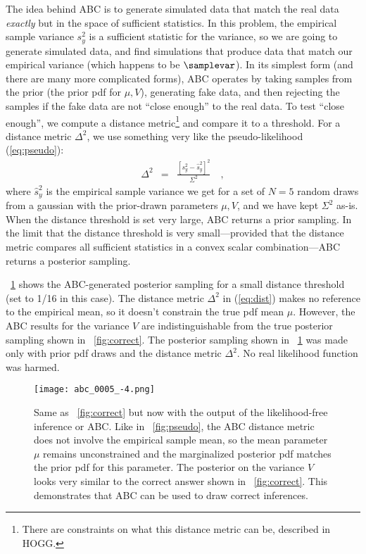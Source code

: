 \documentclass[12pt, letterpaper, preprint]{aastex}
\begin{document}
The idea behind ABC is to generate simulated data that match the
real data \emph{exactly} but in the space of sufficient statistics.
In this problem, the empirical sample variance $s^2_y$ is a sufficient
statistic for the variance, so we are going to generate simulated
data, and find simulations that produce data that match our empirical
variance (which happens to be $\samplevar$).
In its simplest form (and there are many more complicated forms), ABC
operates by taking samples from the prior (the prior pdf for $\mu,
V$), generating fake data, and then rejecting the samples if the fake
data are not ``close enough'' to the real data.
To test ``close enough'', we compute a distance metric\footnote{There
  are constraints on what this distance metric can be, described in
  HOGG.} and compare it to a threshold.
For a distance metric $\Delta^2$, we use something very like the
pseudo-likelihood (\ref{eq:pseudo}):
\begin{eqnarray}
\Delta^2 &=& \frac{[s^2_y - \hat{s}^2_y]^2}{\Sigma^2}
\label{eq:dist}\quad ,
\end{eqnarray}
where $\hat{s}^2_y$ is the empirical sample variance we get for a set
of $N=5$ random draws from a gaussian with the prior-drawn parameters
$\mu, V$, and we have kept $\Sigma^2$ as-is.
When the distance threshold is set very large, ABC returns a prior
sampling.
In the limit that the distance threshold is very small---provided that
the distance metric compares all sufficient statistics in a convex
scalar combination---ABC returns a posterior sampling.

\figurename~\ref{fig:abc} shows the ABC-generated posterior sampling
for a small distance threshold (set to 1/16 in this case).
The distance metric $\Delta^2$ in (\ref{eq:dist}) makes no reference
to the empirical mean, so it doesn't constrain the true pdf mean
$\mu$.
However, the ABC results for the variance $V$ are indistinguishable
from the true posterior sampling shown in \figurename~\ref{fig:correct}.
The posterior sampling shown in \figurename~\ref{fig:abc} was made
only with prior pdf draws and the distance metric $\Delta^2$.
No real likelihood function was harmed.%
\begin{figure}
\texttt{[image: abc\_0005\_-4.png]}
\caption{Same as \figurename~\ref{fig:correct} but now with the output
  of the likelihood-free inference or ABC. Like in
  \figurename~\ref{fig:pseudo}, the ABC distance metric does not
  involve the empirical sample mean, so the mean parameter $\mu$
  remains unconstrained and the marginalized posterior pdf matches the
  prior pdf for this parameter. The posterior on the variance $V$
  looks very similar to the correct answer shown in
  \figurename~\ref{fig:correct}. This demonstrates that ABC can be
  used to draw correct inferences.\label{fig:abc}}
\end{figure}
\end{document}
